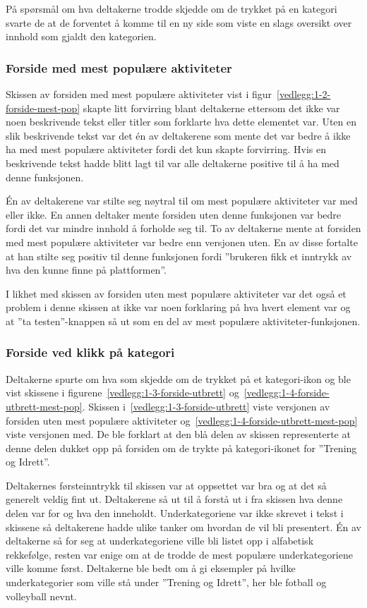 På spørsmål om hva deltakerne trodde skjedde om de trykket på en kategori svarte de at de forventet å komme til en ny side som viste en slags oversikt over innhold som gjaldt den kategorien.

\subsubsection{Forside med mest populære aktiviteter}
Skissen av forsiden med mest populære aktiviteter vist i figur~\ref{vedlegg:1-2-forside-mest-pop} skapte litt forvirring blant deltakerne ettersom det ikke var noen beskrivende tekst eller titler som forklarte hva dette elementet var. Uten en slik beskrivende tekst var det én av deltakerene som mente det var bedre å ikke ha med mest populære aktiviteter fordi det kun skapte forvirring. Hvis en beskrivende tekst hadde blitt lagt til var alle deltakerne positive til å ha med denne funksjonen. 

Én av deltakerene var stilte seg nøytral til om mest populære aktiviteter var med eller ikke. En annen deltaker mente forsiden uten denne funksjonen var bedre fordi det var mindre innhold å forholde seg til. To av deltakerne mente at forsiden med mest populære aktiviteter var bedre enn versjonen uten. En av disse fortalte at han stilte seg positiv til denne funksjonen fordi ''brukeren fikk et inntrykk av hva den kunne finne på plattformen''.

I likhet med skissen av forsiden uten mest populære aktiviteter var det også et problem i denne skissen at ikke var noen forklaring på hva hvert element var og at ''ta testen''-knappen så ut som en del av mest populære aktiviteter-funksjonen. 

\subsubsection{Forside ved klikk på kategori}
Deltakerne spurte om hva som skjedde om de trykket på et kategori-ikon og ble vist skissene i figurene~\ref{vedlegg:1-3-forside-utbrett} og~\ref{vedlegg:1-4-forside-utbrett-mest-pop}. Skissen i~\ref{vedlegg:1-3-forside-utbrett} viste versjonen av forsiden uten mest populære aktiviteter og~\ref{vedlegg:1-4-forside-utbrett-mest-pop} viste versjonen med. De ble forklart at den blå delen av skissen representerte at denne delen dukket opp på forsiden om de trykte på kategori-ikonet for ''Trening og Idrett''.

Deltakernes førsteinntrykk til skissen var at oppsettet var bra og at det så generelt veldig fint ut. Deltakerene så ut til å forstå ut i fra skissen hva denne delen var for og hva den inneholdt. Underkategoriene var ikke skrevet i tekst i skissene så deltakerene hadde ulike tanker om hvordan de vil bli presentert. Én av deltakerne så for seg at underkategoriene ville bli listet opp i alfabetisk rekkefølge, resten var enige om at de trodde de mest populære underkategoriene ville komme først. Deltakerne ble bedt om å gi eksempler på hvilke underkategorier som ville stå under ''Trening og Idrett'', her ble fotball og volleyball nevnt.

